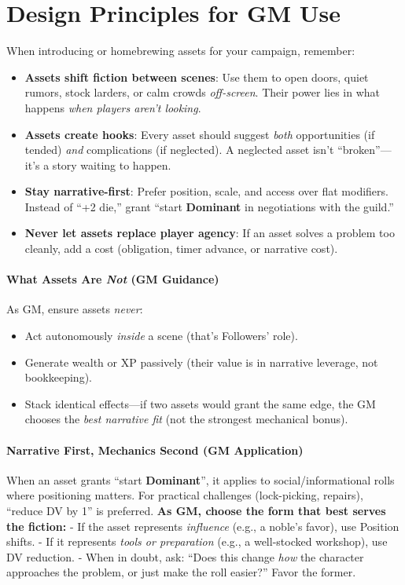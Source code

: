 \section{Design Principles for GM Use}
When introducing or homebrewing assets for your campaign, remember:  
\begin{itemize}
  \item \textbf{Assets shift fiction between scenes}: Use them to open doors, quiet rumors, stock larders, or calm crowds \emph{off-screen}. Their power lies in what happens \emph{when players aren't looking}.  
  \item \textbf{Assets create hooks}: Every asset should suggest \emph{both} opportunities (if tended) \emph{and} complications (if neglected). A neglected asset isn't ``broken''---it's a story waiting to happen.  
  \item \textbf{Stay narrative-first}: Prefer position, scale, and access over flat modifiers. Instead of ``+2 die,'' grant ``start \textbf{Dominant} in negotiations with the guild.''  
  \item \textbf{Never let assets replace player agency}: If an asset solves a problem too cleanly, add a cost (obligation, timer advance, or narrative cost).  
\end{itemize}

\paragraph{What Assets Are \emph{Not} (GM Guidance)}
As GM, ensure assets \emph{never}:  
\begin{itemize}
  \item Act autonomously \emph{inside} a scene (that's Followers' role).  
  \item Generate wealth or XP passively (their value is in narrative leverage, not bookkeeping).  
  \item Stack identical effects---if two assets would grant the same edge, the GM chooses the \emph{best narrative fit} (not the strongest mechanical bonus).  
\end{itemize}

\paragraph{Narrative First, Mechanics Second (GM Application)}
When an asset grants ``start \textbf{Dominant}'', it applies to social/informational rolls where positioning matters. For practical challenges (lock-picking, repairs), ``reduce DV by 1'' is preferred. \textbf{As GM, choose the form that best serves the fiction:}  
- If the asset represents \textit{influence} (e.g., a noble's favor), use Position shifts.  
- If it represents \textit{tools or preparation} (e.g., a well-stocked workshop), use DV reduction.  
- When in doubt, ask: ``Does this change \textit{how} the character approaches the problem, or just make the roll easier?'' Favor the former.

